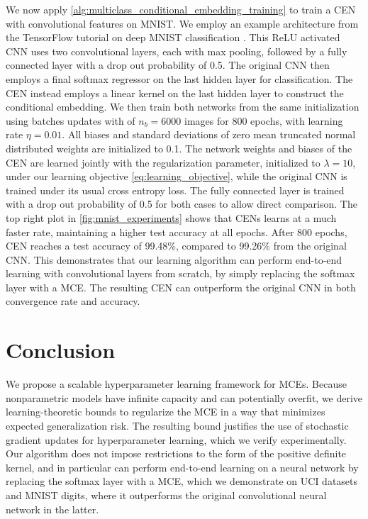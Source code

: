\documentclass[twoside]{article}
\begin{document}
		We now apply \cref{alg:multiclass_conditional_embedding_training} to train a \gls{CEN} with convolutional features on MNIST. We employ an example architecture from the TensorFlow tutorial on deep MNIST classification \citep{abadi2016tensorflow}. This ReLU activated \gls{CNN} uses two convolutional layers, each with max pooling, followed by a fully connected layer with a drop out probability of 0.5. The original \gls{CNN} then employs a final softmax regressor on the last hidden layer for classification. The \gls{CEN} instead employs a linear kernel on the last hidden layer to construct the conditional embedding. We then train both networks from the same initialization using batches updates with of $n_{b} = 6000$ images for 800 epochs, with learning rate $\eta = 0.01$. All biases and standard deviations of zero mean truncated normal distributed weights are initialized to 0.1. The network weights and biases of the \gls{CEN} are learned jointly with the regularization parameter, initialized to $\lambda = 10$, under our learning objective \eqref{eq:learning_objective}, while the original \gls{CNN} is trained under its usual cross entropy loss. The fully connected layer is trained with a drop out probability of 0.5 for both cases to allow direct comparison. The top right plot in \cref{fig:mnist_experiments} shows that \glspl{CEN} learns at a much faster rate, maintaining a higher test accuracy at all epochs. After 800 epochs, \gls{CEN} reaches a test accuracy of 99.48\%, compared to 99.26\% from the original \gls{CNN}. This demonstrates that our learning algorithm can perform end-to-end learning with convolutional layers from scratch, by simply replacing the softmax layer with a \gls{MCE}. The resulting \gls{CEN} can outperform the original \gls{CNN} in both convergence rate and accuracy.
	
	\section{Conclusion}
	
		We propose a scalable hyperparameter learning framework for \glspl{MCE}. Because nonparametric models have infinite capacity and can potentially overfit, we derive learning-theoretic bounds to regularize the \gls{MCE} in a way that minimizes expected generalization risk. The resulting bound justifies the use of stochastic gradient updates for hyperparameter learning, which we verify experimentally. Our algorithm does not impose restrictions to the form of the positive definite kernel, and in particular can perform end-to-end learning on a neural network by replacing the softmax layer with a \gls{MCE}, which we demonstrate on UCI datasets and MNIST digits, where it outperforms the original convolutional neural network in the latter.
		
\end{document}
